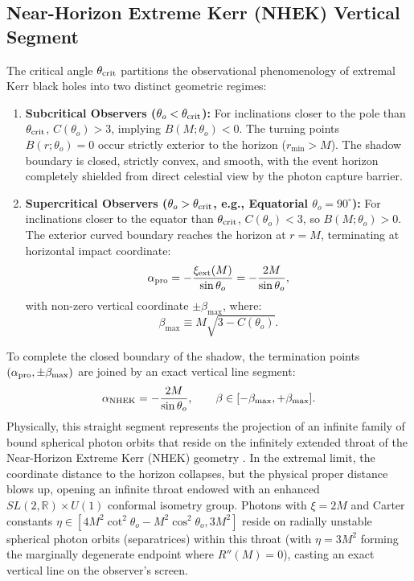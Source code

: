 \subsection{Near-Horizon Extreme Kerr (NHEK) Vertical Segment}
\label{subsec:nhek_vertical_segment}
The critical angle $\theta_{\rm crit}$ partitions the observational phenomenology of extremal Kerr black holes into two distinct geometric regimes:
\begin{enumerate}
    \item \textbf{Subcritical Observers ($\theta_o < \theta_{\rm crit}$):}  
    For inclinations closer to the pole than $\theta_{\rm crit}$, $C(\theta_o) > 3$, implying $B(M; \theta_o) < 0$. The turning points $B(r; \theta_o) = 0$ occur strictly exterior to the horizon ($r_{\min} > M$). The shadow boundary is closed, strictly convex, and smooth, with the event horizon completely shielded from direct celestial view by the photon capture barrier.
    
    \item \textbf{Supercritical Observers ($\theta_o > \theta_{\rm crit}$, e.g., Equatorial $\theta_o = 90^\circ$):}  
    For inclinations closer to the equator than $\theta_{\rm crit}$, $C(\theta_o) < 3$, so $B(M; \theta_o) > 0$. The exterior curved boundary reaches the horizon at $r = M$, terminating at horizontal impact coordinate:
    \begin{equation}
        \alpha_{\rm pro} = -\frac{\xi_{\rm ext}(M)}{\sin\theta_o} = -\frac{2M}{\sin\theta_o},
    \end{equation}
    with non-zero vertical coordinate $\pm \beta_{\max}$, where:
    \begin{equation}
        \beta_{\max} \equiv M \sqrt{3 - C(\theta_o)}.
        \label{eq:beta_max_nhek}
    \end{equation}
\end{enumerate}

To complete the closed boundary of the shadow, the termination points $(\alpha_{\rm pro}, \pm\beta_{\max})$ are joined by an exact vertical line segment:
\begin{equation}
    \alpha_{\rm NHEK} = -\frac{2M}{\sin\theta_o}, \qquad \beta \in [-\beta_{\max}, +\beta_{\max}].
    \label{eq:nhek_line_segment}
\end{equation}
Physically, this straight segment represents the projection of an infinite family of bound spherical photon orbits that reside on the infinitely extended throat of the Near-Horizon Extreme Kerr (NHEK) geometry \cite{BardeenPressTeukolsky1972,Gralla2020}. In the extremal limit, the coordinate distance to the horizon collapses, but the physical proper distance blows up, opening an infinite throat endowed with an enhanced $SL(2, \mathbb{R}) \times U(1)$ conformal isometry group. Photons with $\xi = 2M$ and Carter constants $\eta \in [4M^2\cot^2\theta_o - M^2\cos^2\theta_o, 3M^2]$ reside on radially unstable spherical photon orbits (separatrices) within this throat (with $\eta = 3M^2$ forming the marginally degenerate endpoint where $R''(M) = 0$), casting an exact vertical line on the observer's screen.

